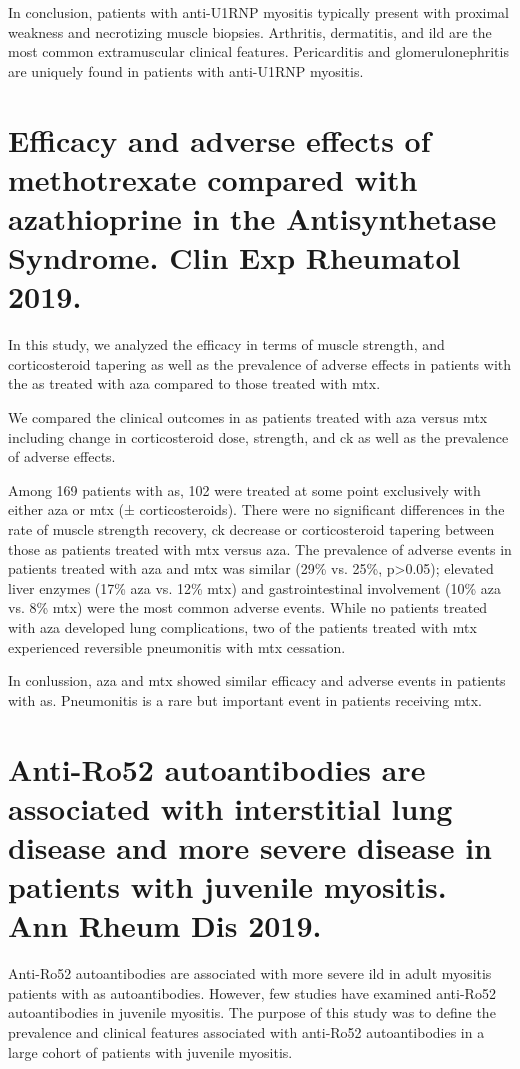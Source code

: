In conclusion, patients with anti-U1RNP myositis typically present with proximal weakness and necrotizing muscle biopsies. Arthritis, dermatitis, and \gls{ild} are the most common extramuscular clinical features. Pericarditis and glomerulonephritis are uniquely found in patients with anti-U1RNP myositis.


{\cleardoublepage}

\section{Efficacy and adverse effects of methotrexate compared with azathioprine in the Antisynthetase Syndrome. Clin Exp Rheumatol 2019.}
\label{sec:mtx_aza}
In this study, we analyzed the efficacy in terms of muscle strength, and corticosteroid tapering as well as the prevalence of adverse effects in patients with the \gls{as} treated with \gls{aza} compared to those treated with \gls{mtx}.

We compared the clinical outcomes in \gls{as} patients treated with \gls{aza} versus \gls{mtx} including change in corticosteroid dose, strength, and \gls{ck} as well as the prevalence of adverse effects.

Among 169 patients with \gls{as}, 102 were treated at some point exclusively with either \gls{aza} or \gls{mtx} (± corticosteroids). There were no significant differences in the rate of muscle strength recovery, \gls{ck} decrease or corticosteroid tapering between those \gls{as} patients treated with \gls{mtx} versus \gls{aza}. The prevalence of adverse events in patients treated with \gls{aza} and \gls{mtx} was similar (29\% vs. 25\%, p>0.05); elevated liver enzymes (17\% \gls{aza} vs. 12\% \gls{mtx}) and gastrointestinal involvement (10\% \gls{aza} vs. 8\% \gls{mtx}) were the most common adverse events. While no patients treated with \gls{aza} developed lung complications, two of the patients treated with \gls{mtx} experienced reversible pneumonitis with \gls{mtx} cessation. 

In conlussion, \gls{aza} and \gls{mtx} showed similar efficacy and adverse events in patients with \gls{as}. Pneumonitis is a rare but important event in patients receiving \gls{mtx}.


{\cleardoublepage}

\section{Anti-Ro52 autoantibodies are associated with interstitial lung disease and more severe disease in patients with juvenile myositis. Ann Rheum Dis 2019.}
\label{sec:ro52}
Anti-Ro52 autoantibodies are associated with more severe \gls{ild} in adult myositis patients with \gls{as} autoantibodies. However, few studies have examined anti-Ro52 autoantibodies in juvenile myositis. The purpose of this study was to define the prevalence and clinical features associated with anti-Ro52 autoantibodies in a large cohort of patients with juvenile myositis.

